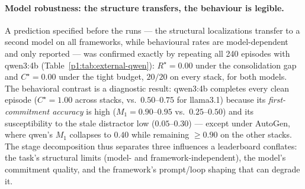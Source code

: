 \documentclass{article}
\begin{document}
\paragraph{Model robustness: the structure transfers, the behaviour is
legible.} A prediction specified before the runs --- the structural
localizations transfer to a second model on all frameworks, while
behavioural rates are model-dependent and only reported --- was
confirmed exactly by repeating all 240 episodes with qwen3:4b
(Table~\ref{p1:tab:external-qwen}): $R^\star{=}0.00$ under the
consolidation gap and $C^\star{=}0.00$ under the tight budget, $20/20$
on every stack, for both models. The behavioral contrast is a
diagnostic result: qwen3:4b completes every clean episode
($C^\star{=}1.00$ across stacks, vs.\ $0.50$--$0.75$ for llama3.1)
because its \emph{first-commitment accuracy} is high
($M_1{=}0.90$--$0.95$ vs.\ $0.25$--$0.50$) and its susceptibility to
the stale distractor low ($0.05$--$0.30$) --- except under AutoGen,
where qwen's $M_1$ collapses to $0.40$ while remaining $\ge 0.90$ on
the other stacks. The stage decomposition thus separates three
influences a leaderboard conflates: the task's structural limits
(model- and framework-independent), the model's commitment quality,
and the framework's prompt/loop shaping that can degrade it.
\end{document}
